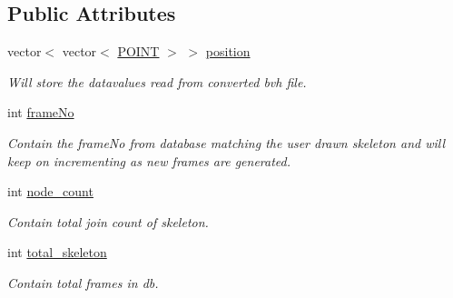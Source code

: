 \subsection*{\-Public \-Attributes}
\begin{DoxyCompactItemize}
\item 
vector$<$ vector$<$ \hyperlink{structPOINT}{\-P\-O\-I\-N\-T} $>$ $>$ \hyperlink{classRetrievedSkeleton_ad60fef3aad1bc9f9425c6bea6633c268}{position}
\begin{DoxyCompactList}\small\item\em \-Will store the datavalues read from converted bvh file. \end{DoxyCompactList}\item 
\hypertarget{classRetrievedSkeleton_aad667e65274158e4b5586136b52f137f}{int \hyperlink{classRetrievedSkeleton_aad667e65274158e4b5586136b52f137f}{frame\-No}}\label{classRetrievedSkeleton_aad667e65274158e4b5586136b52f137f}

\begin{DoxyCompactList}\small\item\em \-Contain the frame\-No from database matching the user drawn skeleton and will keep on incrementing as new frames are generated. \end{DoxyCompactList}\item 
\hypertarget{classRetrievedSkeleton_a03732ee286c4c0fe55faa62e5cca2490}{int \hyperlink{classRetrievedSkeleton_a03732ee286c4c0fe55faa62e5cca2490}{node\-\_\-count}}\label{classRetrievedSkeleton_a03732ee286c4c0fe55faa62e5cca2490}

\begin{DoxyCompactList}\small\item\em \-Contain total join count of skeleton. \end{DoxyCompactList}\item 
\hypertarget{classRetrievedSkeleton_abdca9dec6d142fc784a6c7712fe54bf9}{int \hyperlink{classRetrievedSkeleton_abdca9dec6d142fc784a6c7712fe54bf9}{total\-\_\-skeleton}}\label{classRetrievedSkeleton_abdca9dec6d142fc784a6c7712fe54bf9}

\begin{DoxyCompactList}\small\item\em \-Contain total frames in db. \end{DoxyCompactList}\end{DoxyCompactItemize}


